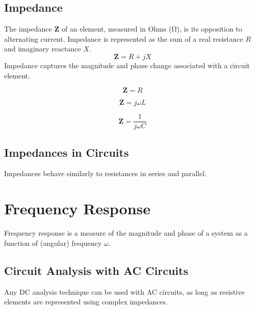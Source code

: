 \documentclass{article}
\begin{document}
\subsection{Impedance}
\begin{definition}
    The impedance $\symbf{Z}$ of an element, measured in Ohms (\si{\ohm}), is its opposition to alternating current.
    Impedance is represented as the sum of a real resistance $R$ and imaginary reactance $X$.
    \begin{equation*}
        \symbf{Z} = R + jX
    \end{equation*}
    Impedance captures the magnitude and phase change associated with a circuit element.
\end{definition}
\begin{theorem}
    \begin{equation*}
        \symbf{Z} = R
    \end{equation*}
\end{theorem}
\begin{theorem}
    \begin{equation*}
        \symbf{Z} = j\omega L
    \end{equation*}
\end{theorem}
\begin{theorem}
    \begin{equation*}
        \symbf{Z} = \frac{1}{j\omega C}
    \end{equation*}
\end{theorem}
\subsection{Impedances in Circuits}
\begin{theorem}
    Impedances behave similarly to resistances in series and parallel.
\end{theorem}
\newpage
\section{Frequency Response}
Frequency response is a measure of the magnitude and phase of a system as a function of (angular) frequency $\omega$.
\subsection{Circuit Analysis with AC Circuits}
\begin{theorem}
    Any DC analysis technique can be used with AC circuits, as long as
    resistive elements are represented using complex impedances.
\end{theorem}
\end{document}
